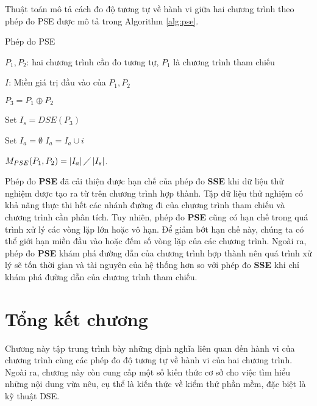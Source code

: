 Thuật toán mô tả cách đo độ tương tự về hành vi giữa hai chương trình theo phép đo PSE được mô tả trong Algorithm \ref{alg:pse}.

 \begin{algorithm}[h]
   \caption{Phép đo PSE}
   \label{alg:pse}
   \begin{algorithmic}
   \item $P_{1}, P_{2}$: hai chương trình cần đo tương tự, $P_1$ là
     chương trình tham chiếu
   \item $I$: Miền giá trị đầu vào của $P_{1}, P_{2}$
   \item $P_{3} = P_1 \oplus P_2$
   \item Set $I_{s} = DSE(P_{3})$ 
   \item Set $I_{a} = \emptyset$ 
     	\State $I_{a} = I_{a} \cup i$ 
     	\EndIf 
     	\EndFor
   \item
     $M_{PSE}(P_{1}, P_{2}) = \left|I_{a}\right| \diagup
     \left|I_{s}\right| $.
   \end{algorithmic}
 \end{algorithm}

Phép đo \textbf{PSE} đã cải thiện được hạn chế của phép đo
 \textbf{SSE} khi dữ liệu thử nghiệm được tạo ra từ trên chương trình
 hợp thành. Tập dữ liệu thử nghiệm có khả năng thực thi hết các nhánh
 đường đi của chương trình tham chiếu và chương trình cần phân
 tích. Tuy nhiên, phép đo \textbf{PSE} cũng có hạn chế trong quá trình
 xử lý các vòng lặp lớn hoặc vô hạn. Để giảm bớt hạn chế này, chúng ta
 có thể giới hạn miền đầu vào hoặc đếm số vòng lặp của các chương
 trình. Ngoài ra, phép đo \textbf{PSE} khám phá đường dẫn của chương
 trình hợp thành nên quá trình xử lý sẽ tốn thời gian và tài nguyên
 của hệ thống hơn so với phép đo \textbf{SSE} khi chỉ khám phá đường
 dẫn của chương trình tham chiếu.

 \section*{Tổng kết chương}
 
 Chương này tập trung trình bày những định nghĩa liên quan đến hành vi
 của chương trình cùng các phép đo độ tương tự về hành vi của hai
 chương trình. Ngoài ra, chương này còn cung cấp một số kiến thức cơ
 sở cho việc tìm hiểu những nội dung vừa nêu, cụ thể là kiến thức về
 kiểm thử phần mềm, đặc biệt là kỹ thuật DSE.
 
